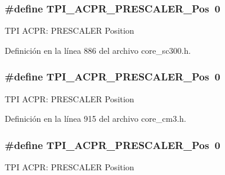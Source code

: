 \subsubsection[{\texorpdfstring{T\+P\+I\+\_\+\+A\+C\+P\+R\+\_\+\+P\+R\+E\+S\+C\+A\+L\+E\+R\+\_\+\+Pos}{TPI_ACPR_PRESCALER_Pos}}]{\setlength{\rightskip}{0pt plus 5cm}\#define T\+P\+I\+\_\+\+A\+C\+P\+R\+\_\+\+P\+R\+E\+S\+C\+A\+L\+E\+R\+\_\+\+Pos~0}\hypertarget{group___c_m_s_i_s___t_p_i_ga5a82d274eb2df8b0c92dd4ed63535928}{}\label{group___c_m_s_i_s___t_p_i_ga5a82d274eb2df8b0c92dd4ed63535928}
T\+PI A\+C\+PR\+: P\+R\+E\+S\+C\+A\+L\+ER Position 

Definición en la línea 886 del archivo core\+\_\+sc300.\+h.

\subsubsection[{\texorpdfstring{T\+P\+I\+\_\+\+A\+C\+P\+R\+\_\+\+P\+R\+E\+S\+C\+A\+L\+E\+R\+\_\+\+Pos}{TPI_ACPR_PRESCALER_Pos}}]{\setlength{\rightskip}{0pt plus 5cm}\#define T\+P\+I\+\_\+\+A\+C\+P\+R\+\_\+\+P\+R\+E\+S\+C\+A\+L\+E\+R\+\_\+\+Pos~0}\hypertarget{group___c_m_s_i_s___t_p_i_ga5a82d274eb2df8b0c92dd4ed63535928}{}\label{group___c_m_s_i_s___t_p_i_ga5a82d274eb2df8b0c92dd4ed63535928}
T\+PI A\+C\+PR\+: P\+R\+E\+S\+C\+A\+L\+ER Position 

Definición en la línea 915 del archivo core\+\_\+cm3.\+h.

\subsubsection[{\texorpdfstring{T\+P\+I\+\_\+\+A\+C\+P\+R\+\_\+\+P\+R\+E\+S\+C\+A\+L\+E\+R\+\_\+\+Pos}{TPI_ACPR_PRESCALER_Pos}}]{\setlength{\rightskip}{0pt plus 5cm}\#define T\+P\+I\+\_\+\+A\+C\+P\+R\+\_\+\+P\+R\+E\+S\+C\+A\+L\+E\+R\+\_\+\+Pos~0}\hypertarget{group___c_m_s_i_s___t_p_i_ga5a82d274eb2df8b0c92dd4ed63535928}{}\label{group___c_m_s_i_s___t_p_i_ga5a82d274eb2df8b0c92dd4ed63535928}
T\+PI A\+C\+PR\+: P\+R\+E\+S\+C\+A\+L\+ER Position 

